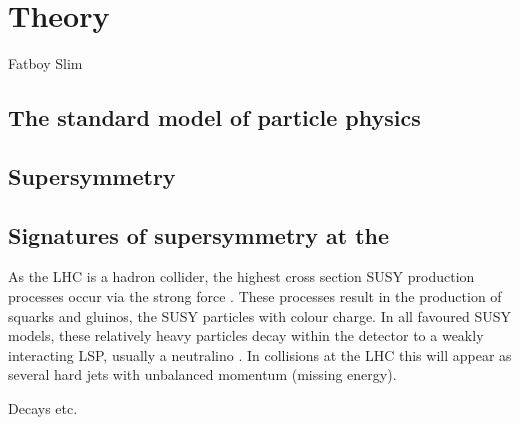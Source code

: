 \chapter{Theory}
\label{chap:theory}

{Fatboy Slim}

\section{The standard model of particle physics}
\label{sec:sm}


\section{Supersymmetry}
\label{sec:susy}


\section{Signatures of supersymmetry at the \LHC}

As the LHC is a hadron collider, the highest cross section SUSY
production processes occur via the strong force
\cite{Martin:1997ns}
\cite{SUSYxsections_NewAspectsof_pp_collisions}. These processes
result in the production of squarks and gluinos, the SUSY particles
with colour charge. In all favoured SUSY models, these relatively
heavy particles decay within the detector to a weakly interacting LSP,
usually a neutralino \cite{Farrar:1978xj}. In
collisions at the LHC this will appear as several hard jets with
unbalanced momentum (missing energy). 

Decays etc.

